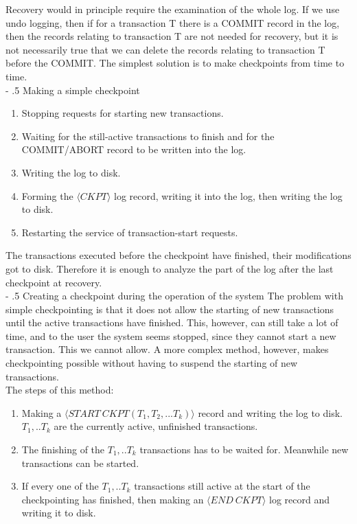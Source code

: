 \documentclass[margin=0px]{article}
\makeatletter
\renewcommand\paragraph{%
	\@startsection{paragraph}{4}{0mm}%
	{-\baselineskip}%
	{.5\baselineskip}%
	{\normalfont\normalsize\bfseries}}
\makeatother
\begin{document}
Recovery would in principle require the examination of the whole log. If we use undo logging, then if for a transaction T
there is a COMMIT record in the log, then the records relating to transaction T are not needed for recovery, but
it is not necessarily true that we can delete the records relating to transaction T before the COMMIT. The simplest solution
is to make checkpoints from time to time.\\

\paragraph{Making a simple checkpoint}
\begin{enumerate}
    \item	Stopping requests for starting new transactions.
    \item	Waiting for the still-active transactions to finish and for the COMMIT/ABORT record to be written into the log.
    \item	Writing the log to disk.
    \item	Forming the $\langle CKPT \rangle$ log record, writing it into the log, then writing the log to disk.
    \item	Restarting the service of transaction-start requests.
\end{enumerate}

The transactions executed before the checkpoint have finished, their modifications got to disk. Therefore it is enough to analyze the part of the
log after the last checkpoint at recovery.\\

\paragraph{Creating a checkpoint during the operation of the system}
The problem with simple checkpointing is that it does not allow the starting of new transactions until the active transactions have
finished. This, however, can still take a lot of time, and to the user the system seems stopped, since they cannot
start a new transaction. This we cannot allow. A more complex method, however, makes checkpointing possible
without having to suspend the starting of new transactions.\\

\noindent The steps of this method:
\begin{enumerate}
    \item	Making a $\langle START \ CKPT(T_{1},T_{2},...T_{k}) \rangle$ record and writing the log to disk. $T_{1},..T_{k}$
          are the currently active, unfinished transactions.

    \item	The finishing of the $T_{1},..T_{k}$ transactions has to be waited for. Meanwhile new transactions can be started.

    \item	If every one of the $T_{1},..T_{k}$ transactions still active at the start of the checkpointing has finished, then
          making an $\langle END \ CKPT \rangle$ log record and writing it to disk.
\end{enumerate}
\end{document}
